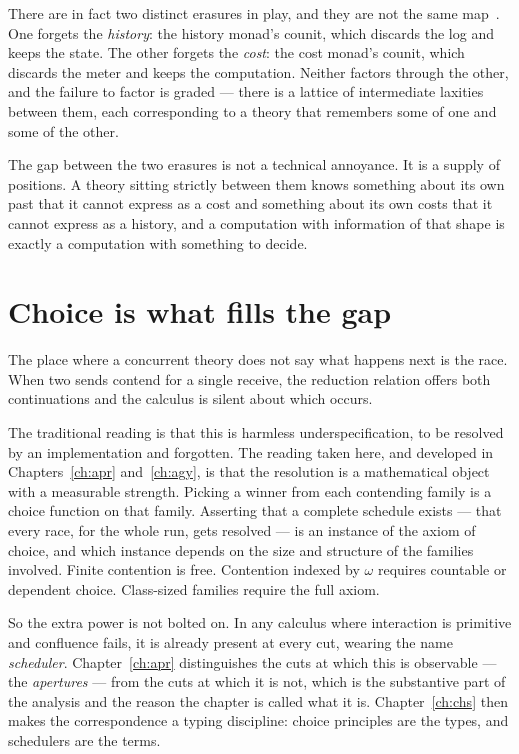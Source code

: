 \begin{remark}
\label{rmk:two-erasures}
There are in fact two distinct erasures in play, and they are not the
same map~\cite{TwoErasures}.
One forgets the \emph{history}: the history monad's counit, which
discards the log and keeps the state.
The other forgets the \emph{cost}: the cost monad's counit, which
discards the meter and keeps the computation.
Neither factors through the other, and the failure to factor is graded
--- there is a lattice of intermediate laxities between them, each
corresponding to a theory that remembers some of one and some of the
other.

The gap between the two erasures is not a technical annoyance.
It is a supply of positions.
A theory sitting strictly between them knows something about its own past
that it cannot express as a cost and something about its own costs that
it cannot express as a history, and a computation with information of
that shape is exactly a computation with something to decide.
\end{remark}

\section{Choice is what fills the gap}

The place where a concurrent theory does not say what happens next is the
race.
When two sends contend for a single receive, the reduction relation
offers both continuations and the calculus is silent about which occurs.

The traditional reading is that this is harmless underspecification, to be
resolved by an implementation and forgotten.
The reading taken here, and developed in Chapters~\ref{ch:apr}
and~\ref{ch:agy}, is that the resolution is a mathematical object with a
measurable strength.
Picking a winner from each contending family is a choice function on that
family.
Asserting that a complete schedule exists --- that every race, for the
whole run, gets resolved --- is an instance of the axiom of choice, and
which instance depends on the size and structure of the families
involved.
Finite contention is free.
Contention indexed by $\omega$ requires countable or dependent choice.
Class-sized families require the full axiom.

So the extra power is not bolted on.
In any calculus where interaction is primitive and confluence fails, it
is already present at every cut, wearing the name \emph{scheduler}.
Chapter~\ref{ch:apr} distinguishes the cuts at which this is observable
--- the \emph{apertures} --- from the cuts at which it is not, which is
the substantive part of the analysis and the reason the chapter is called
what it is.
Chapter~\ref{ch:chs} then makes the correspondence a typing discipline:
choice principles are the types, and schedulers are the terms.

